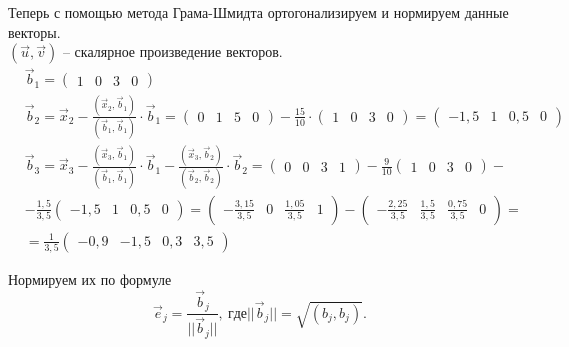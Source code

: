 	Теперь с помощью метода Грама-Шмидта ортогонализируем и нормируем данные векторы.\\
	$(\vec{u}, \vec{v})$ -- скалярное произведение векторов.	
	\begin{align*}
	&\vec b_1 = \begin{pmatrix} 1 & 0 & 3 & 0 \end{pmatrix} \\
	&\vec b_2 = \vec x_2 - \frac{(\vec x_2,\vec b_1)}{(\vec b_1,\vec b_1)} \cdot \vec b_1  = \begin{pmatrix} 0 & 1 & 5 & 0 \end{pmatrix} - \frac{15}{10} \cdot \begin{pmatrix} 1 & 0 & 3 & 0 \end{pmatrix} = \begin{pmatrix} -1,5 & 1 & 0,5 & 0 \end{pmatrix} \\
	&\vec b_3 = \vec x_3 - \frac{(\vec x_3,\vec b_1)}{(\vec b_1,\vec b_1)} \cdot \vec b_1 - \frac{(\vec x_3,\vec b_2)}{(\vec b_2,\vec b_2)} \cdot \vec b_2  = \begin{pmatrix} 0 & 0 & 3 & 1 \end{pmatrix} - \frac{9}{10} \begin{pmatrix} 1 & 0 & 3 & 0 \end{pmatrix} - \\
	& - \frac{1,5}{3,5} \begin{pmatrix} -1,5 & 1 & 0,5 & 0 \end{pmatrix} = \begin{pmatrix} -\frac{3,15}{3,5} & 0 & \frac{1,05}{3,5} & 1 \end{pmatrix} - \begin{pmatrix} -\frac{2,25}{3,5} & \frac{1,5}{3,5} & \frac{0,75}{3,5} & 0 \end{pmatrix} = \\
	& = \frac{1}{3,5}\begin{pmatrix} -0,9 & -1,5 & 0,3 & 3,5 \end{pmatrix}
	\end{align*}
	
	Нормируем их по формуле
	\[
		\vec e_j = \frac{\vec b_j}{||\vec b_j||},\ где ||\vec b_j|| = \sqrt{(b_j, b_j)}.
	\]
	
